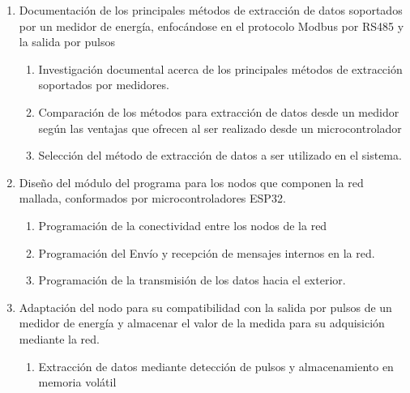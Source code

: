 \documentclass[12pt,letterpaper]{article}
\begin{document}
\begin{enumerate}[1.]
	
	
	
	\item Documentación de los principales métodos de extracción de datos soportados por un medidor de energía, enfocándose en el protocolo Modbus por RS485 y la salida por pulsos
	
		\begin{enumerate}
		
		\item Investigación documental acerca de los principales métodos de extracción soportados por medidores. 
		
		\item Comparación de los métodos para extracción de datos desde un medidor según las ventajas que ofrecen al ser realizado desde un microcontrolador
		
		\item Selección del método de extracción de datos a ser utilizado en el sistema.
		
		
	\end{enumerate}
	
	\item  Diseño del módulo del programa para los nodos que componen la red mallada, conformados por microcontroladores ESP32.
	
	
	\begin{enumerate}
		
		\item Programación de la conectividad entre los nodos de la red
		
		\item Programación del Envío y recepción de mensajes internos en la red.
		
		\item Programación de la transmisión de los datos hacia el exterior.
		
		
		
	\end{enumerate}
	
	
	\item Adaptación del nodo para su compatibilidad con la salida por pulsos de un medidor de energía y almacenar el valor de la medida para su adquisición mediante la red.
	
	
	\begin{enumerate}
		
		\item Extracción de datos mediante detección de pulsos y almacenamiento en memoria volátil
		

\end{enumerate}
\end{enumerate}
\end{document}
